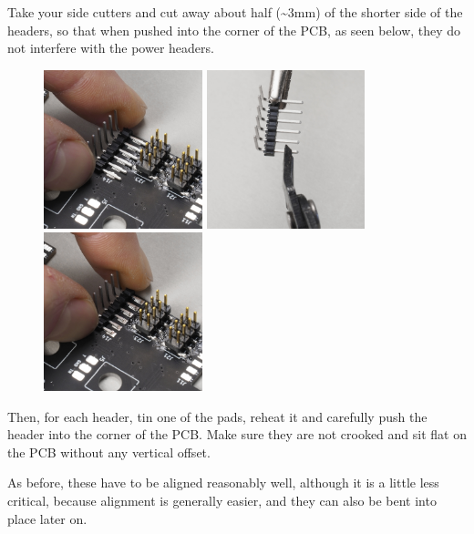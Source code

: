 \documentclass[12pt, a4paper]{article}
\begin{document}
Take your side cutters and cut away about half (\textasciitilde3mm) of the shorter side of the
headers, so that when pushed into the corner of the PCB, as seen below, they do not interfere
with the power headers.

\begin{figure}[H]
    \centering
    \includegraphics[width=46mm]{images/22_01_header_pcb_uncut.jpg}
    \hspace{2mm}
    \includegraphics[width=46mm]{images/22_02_header_cutting.jpg}
    \hspace{2mm}
    \includegraphics[width=46mm]{images/22_03_header_pcb_cut.jpg}
\end{figure}

Then, for each header, tin one of the pads, reheat it and carefully push the header into the 
corner of the PCB. Make sure they are not crooked and sit flat on the PCB without any vertical
offset.

As before, these have to be aligned reasonably well, although it is a little less critical,
because alignment is generally easier, and they can also be bent into place later on.
\end{document}
